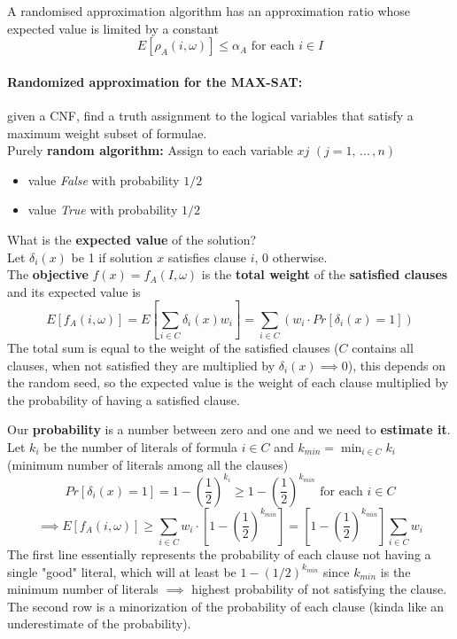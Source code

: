 \documentclass[11pt]{article}
\begin{document}
	A randomised approximation algorithm has an approximation ratio whose expected value is limited by a constant
	$$ E \left[\rho_A (i, \omega)\right] \leq \alpha_A \text{ for each } i \in I $$
	
	\paragraph{Randomized approximation for the MAX-SAT:} given a CNF, find a truth assignment to the logical variables that satisfy a maximum weight subset of formulae.\\
	
	Purely \textbf{random algorithm:} Assign to each variable $xj$ $(j = 1, \, ... \, , n)$
	\begin{itemize}
		\item value \textit{False} with probability $1/2$
		\item value \textit{True} with probability $1/2$
	\end{itemize}
	What is the \textbf{expected value} of the solution? \\
	
	Let $\delta_i (x)$ be 1 if solution $x$ satisfies clause $i$, 0 otherwise.\\
	
	The \textbf{objective} $f (x) = f_A (I , \omega)$ is the \textbf{total weight} of the \textbf{satisfied clauses} and its expected value is
	$$ E \left[f_A (i, \omega)\right] = E \left[\sum_{i \in C} \delta_i (x) w_i \right] = \sum_{i \in C} \left(w_i \cdot Pr \left[\delta_i (x) = 1\right]\right)$$
	The total sum is equal to the weight of the satisfied clauses ($C$ contains all clauses, when not satisfied they are multiplied by $\delta_i (x) \implies 0$), this depends on the random seed, so the expected value is the weight of each clause multiplied by the probability of having a satisfied clause.\\
	
	\newpage
	
	Our \textbf{probability} is a number between zero and one and we need to \textbf{estimate it}.\\
	Let $k_i$ be the number of literals of formula $i \in C$ and $k_{min} = \min_{i \in C} k_i$ (minimum number of literals among all the clauses)
	$$ Pr \left[\delta_i (x) = 1\right] = 1 - \left(\frac{1}{2}\right)^{k_i} \geq 1 - \left(\frac{1}{2}\right)^{k_{min}} \text{ for each } i \in C $$
	$$ \implies E \left[f_A (i, \omega)\right] \geq \sum_{i \in C} w_i \cdot \left[1 - \left(\frac{1}{2}\right)^{k_{min}}\right] = \left[1 - \left(\frac{1}{2}\right)^{k_{min}}\right] \sum_{i \in C} w_i $$
	The first line essentially represents the probability of each clause not having a single "good" literal, which will at least be $1 - (1/2)^{k_{min}}$ since $k_{min}$ is the minimum number of literals $\implies$ highest probability of not satisfying the clause.\\
	The second row is a minorization of the probability of each clause (kinda like an underestimate of the probability).\\
	
\end{document}
